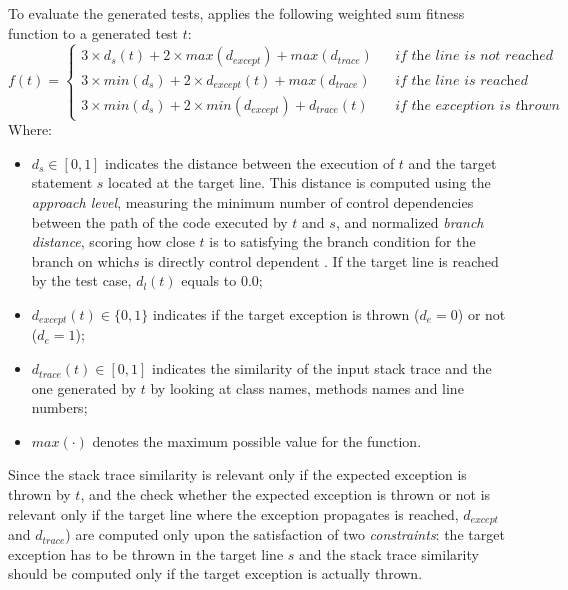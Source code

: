 To evaluate the generated tests, \evocrash applies the following weighted sum fitness function \cite{Soltani2018a} to a generated test $t$:
%
\begin{equation} \label{eq:fitnessfunction}
f(t) = 
\left\{
  \begin{array}{lcr}
    3 \times d_{s}(t) + 2 \times max(d_{except}) + max(d_{trace})   && \textit{if the line is not reached}\\
    3 \times min(d_{s}) + 2 \times d_{except}(t) + max(d_{trace})   && \textit{if the line is reached}\\
    3 \times min(d_{s}) + 2 \times min(d_{except}) + d_{trace}(t)   && \textit{if the exception is thrown}
  \end{array}
\right.
\end{equation}
%
Where:
%
\begin{itemize}
\item $d_{s} \in [0,1]$ indicates the distance between the execution of $t$ and the target statement $s$ located at the target line. 
This distance is computed using the \textit{approach level}, measuring the minimum number of control dependencies between the path of the code executed by $t$ and $s$, and normalized \textit{branch distance}, scoring how close $t$ is to satisfying the branch condition for the branch on which$s$ is directly control dependent \cite{McMinn2004}. 
If the target line is reached by the test case, $d_{l}(t)$ equals to $0.0$;
%
\item $d_{except}(t) \in \{0,1\}$ indicates if the target exception is thrown ($d_{e} = 0$) or not ($d_{e} = 1$);
%
\item $d_{trace}(t) \in [0,1]$ indicates the similarity of the input stack trace and the one generated by $t$ by looking at class names, methods names and line numbers;
%
\item $max(\cdot)$ denotes the maximum possible value for the function.
\end{itemize}
%
Since the stack trace similarity is relevant only if the expected exception is thrown by $t$, and the check whether the expected exception is thrown or not is relevant only if the target line where the exception propagates is reached, $d_{except}$ and $d_{trace}$) are computed only upon the satisfaction of two \emph{constraints}: the target exception has to be thrown in the target line $s$ and the stack trace similarity should be computed only if the target exception is actually thrown. 

